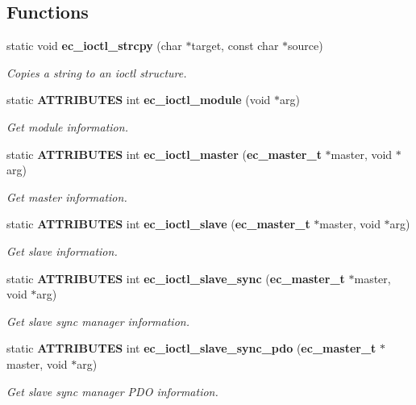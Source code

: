 \subsection*{\-Functions}
\begin{DoxyCompactItemize}
\item 
static void {\bf ec\-\_\-ioctl\-\_\-strcpy} (char $\ast$target, const char $\ast$source)
\begin{DoxyCompactList}\small\item\em \-Copies a string to an ioctl structure. \end{DoxyCompactList}\item 
static {\bf \-A\-T\-T\-R\-I\-B\-U\-T\-E\-S} int {\bf ec\-\_\-ioctl\-\_\-module} (void $\ast$arg)
\begin{DoxyCompactList}\small\item\em \-Get module information. \end{DoxyCompactList}\item 
static {\bf \-A\-T\-T\-R\-I\-B\-U\-T\-E\-S} int {\bf ec\-\_\-ioctl\-\_\-master} ({\bf ec\-\_\-master\-\_\-t} $\ast$master, void $\ast$arg)
\begin{DoxyCompactList}\small\item\em \-Get master information. \end{DoxyCompactList}\item 
static {\bf \-A\-T\-T\-R\-I\-B\-U\-T\-E\-S} int {\bf ec\-\_\-ioctl\-\_\-slave} ({\bf ec\-\_\-master\-\_\-t} $\ast$master, void $\ast$arg)
\begin{DoxyCompactList}\small\item\em \-Get slave information. \end{DoxyCompactList}\item 
static {\bf \-A\-T\-T\-R\-I\-B\-U\-T\-E\-S} int {\bf ec\-\_\-ioctl\-\_\-slave\-\_\-sync} ({\bf ec\-\_\-master\-\_\-t} $\ast$master, void $\ast$arg)
\begin{DoxyCompactList}\small\item\em \-Get slave sync manager information. \end{DoxyCompactList}\item 
static {\bf \-A\-T\-T\-R\-I\-B\-U\-T\-E\-S} int {\bf ec\-\_\-ioctl\-\_\-slave\-\_\-sync\-\_\-pdo} ({\bf ec\-\_\-master\-\_\-t} $\ast$master, void $\ast$arg)
\begin{DoxyCompactList}\small\item\em \-Get slave sync manager \-P\-D\-O information. \end{DoxyCompactList}\item 

\end{DoxyCompactItemize}
